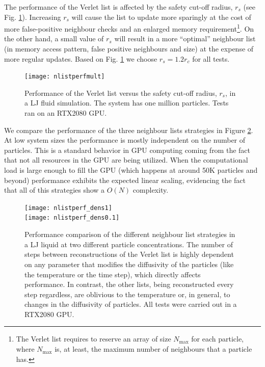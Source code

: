 \documentclass[ twoside,openright,titlepage,numbers=noenddot,%
headinclude,footinclude,cleardoublepage=empty,abstract=on,
BCOR=5mm,paper=b5,fontsize=11pt, dvipsnames
]{scrreprt}
\begin{document}
The performance of the Verlet list is affected by the safety cut-off radius, $r_s$ (see Fig. \ref{fig:verletlistsafety}). Increasing $r_s$ will cause the list to update more sparingly at the cost of more false-positive neighbour checks and an enlarged memory requirement\footnote{The Verlet list requires to reserve an array of size $N_{\text{max}}$ for each particle, where $N_{\text{max}}$ is, at least, the maximum number of neighbours that a particle has.}. On the other hand, a small value of $r_s$ will result in a more ``optimal'' neighbour list (in memory access pattern, false positive neighbours and size) at the expense of more regular updates. Based on Fig. \ref{fig:verletlistsafety} we choose $r_s = 1.2r_c$ for all tests.
\begin{figure}
  \centering
  \texttt{[image: nlistperfmult]}
  \caption{Performance of the Verlet list versus the safety cut-off radius, $r_s$, in a \gls{LJ} fluid simulation. The system has one million particles. Tests ran on an RTX2080 GPU.}
  \label{fig:verletlistsafety}
\end{figure}
We compare the performance of the three neighbour lists strategies in Figure \ref{fig:nlistcomp}. At low system sizes the performance is mostly independent on the number of particles. This is a standard behavior in GPU computing coming from the fact that not all resources in the GPU are being utilized. When the computational load is large enough to fill the GPU (which happens at around 50K particles and beyond) performance exhibits the expected linear scaling, evidencing the fact that all of this strategies show a $O(N)$ complexity. 
\begin{figure}
  \centering
  \texttt{[image: nlistperf\_dens1]}\\
  \texttt{[image: nlistperf\_dens0.1]}
  \caption{Performance comparison of the different neighbour list strategies in a LJ liquid at two different particle concentrations. The number of steps between reconstructions of the Verlet list is highly dependent on any parameter that modifies the diffusivity of the particles (like the temperature or the time step), which directly affects performance. In contrast, the other lists, being reconstructed every step regardless, are oblivious to the temperature or, in general, to changes in the diffusivity of particles. All tests were carried out in a RTX2080 GPU.}
  \label{fig:nlistcomp}
\end{figure}
\end{document}
